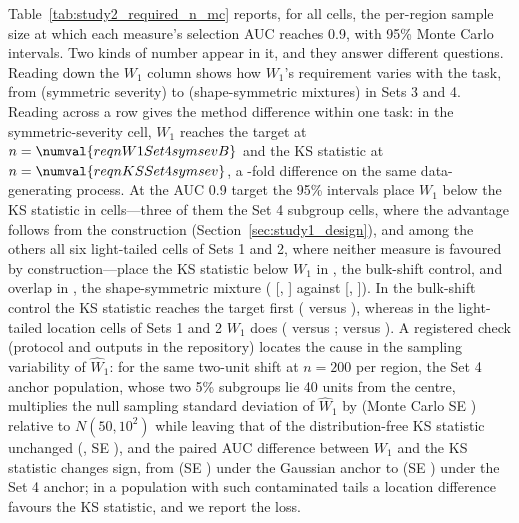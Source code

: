Table~\ref{tab:study2_required_n_mc} reports, for all  cells, the per-region sample size at which each measure's selection AUC reaches 0.9, with 95\% Monte Carlo intervals. Two kinds of number appear in it, and they answer different questions. Reading down the $W_1$ column shows how $W_1$'s requirement varies with the task, from  (symmetric severity) to  (shape-symmetric mixtures) in Sets 3 and 4. Reading across a row gives the method difference within one task: in the symmetric-severity cell, $W_1$ reaches the target at $n = \numval{reqnW1Set4symsevB}$ and the KS statistic at $n = \numval{reqnKSSet4symsev}$, a -fold difference on the same data-generating process. At the AUC 0.9 target the 95\% intervals place $W_1$ below the KS statistic in  cells---three of them the Set 4 subgroup cells, where the advantage follows from the construction (Section~\ref{sec:study1_design}), and among the others all six light-tailed cells of Sets 1 and 2, where neither measure is favoured by construction---place the KS statistic below $W_1$ in , the bulk-shift control, and overlap in , the shape-symmetric mixture ( [, ] against  [, ]). In the bulk-shift control the KS statistic reaches the target first ( versus ), whereas in the light-tailed location cells of Sets 1 and 2 $W_1$ does ( versus ;  versus ). A registered check (protocol and outputs in the repository) locates the cause in the sampling variability of $\widehat{W}_1$: for the same two-unit shift at $n = 200$ per region, the Set 4 anchor population, whose two 5\% subgroups lie 40 units from the centre, multiplies the null sampling standard deviation of $\widehat{W}_1$ by  (Monte Carlo SE ) relative to $N(50, 10^2)$ while leaving that of the distribution-free KS statistic unchanged (, SE ), and the paired AUC difference between $W_1$ and the KS statistic changes sign, from  (SE ) under the Gaussian anchor to  (SE ) under the Set 4 anchor; in a population with such contaminated tails a location difference favours the KS statistic, and we report the loss.

